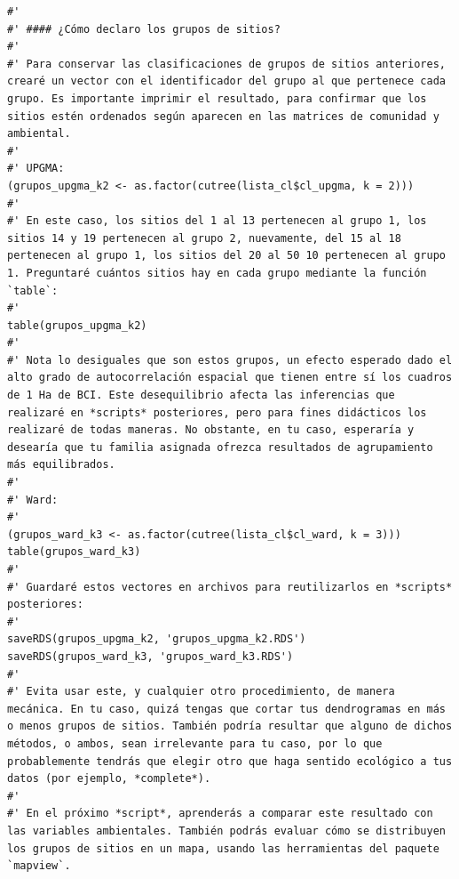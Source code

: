 \documentclass[11pt,]{article}
\begin{document}
\begin{verbatim}
#' 
#' #### ¿Cómo declaro los grupos de sitios?
#' 
#' Para conservar las clasificaciones de grupos de sitios anteriores, crearé un vector con el identificador del grupo al que pertenece cada grupo. Es importante imprimir el resultado, para confirmar que los sitios estén ordenados según aparecen en las matrices de comunidad y ambiental.
#' 
#' UPGMA:
(grupos_upgma_k2 <- as.factor(cutree(lista_cl$cl_upgma, k = 2)))
#' 
#' En este caso, los sitios del 1 al 13 pertenecen al grupo 1, los sitios 14 y 19 pertenecen al grupo 2, nuevamente, del 15 al 18 pertenecen al grupo 1, los sitios del 20 al 50 10 pertenecen al grupo 1. Preguntaré cuántos sitios hay en cada grupo mediante la función `table`:
#' 
table(grupos_upgma_k2)
#' 
#' Nota lo desiguales que son estos grupos, un efecto esperado dado el alto grado de autocorrelación espacial que tienen entre sí los cuadros de 1 Ha de BCI. Este desequilibrio afecta las inferencias que realizaré en *scripts* posteriores, pero para fines didácticos los realizaré de todas maneras. No obstante, en tu caso, esperaría y desearía que tu familia asignada ofrezca resultados de agrupamiento más equilibrados.
#' 
#' Ward:
#' 
(grupos_ward_k3 <- as.factor(cutree(lista_cl$cl_ward, k = 3)))
table(grupos_ward_k3)
#'
#' Guardaré estos vectores en archivos para reutilizarlos en *scripts* posteriores:
#' 
saveRDS(grupos_upgma_k2, 'grupos_upgma_k2.RDS')
saveRDS(grupos_ward_k3, 'grupos_ward_k3.RDS')
#' 
#' Evita usar este, y cualquier otro procedimiento, de manera mecánica. En tu caso, quizá tengas que cortar tus dendrogramas en más o menos grupos de sitios. También podría resultar que alguno de dichos métodos, o ambos, sean irrelevante para tu caso, por lo que probablemente tendrás que elegir otro que haga sentido ecológico a tus datos (por ejemplo, *complete*).
#' 
#' En el próximo *script*, aprenderás a comparar este resultado con las variables ambientales. También podrás evaluar cómo se distribuyen los grupos de sitios en un mapa, usando las herramientas del paquete `mapview`.
\end{verbatim}
\end{document}
